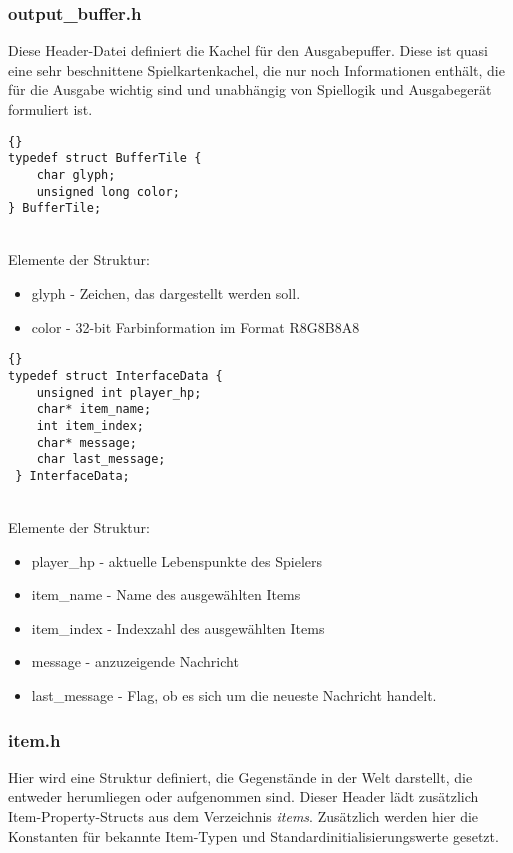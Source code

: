 \documentclass[11pt,a4paper,notitlepage]{report}
\begin{document}
	\newpage
	\subsubsection*{output\_buffer.h}
	Diese Header-Datei definiert die Kachel für den Ausgabepuffer. Diese ist quasi eine sehr beschnittene Spielkartenkachel, die nur noch Informationen enthält, die für die Ausgabe wichtig sind und unabhängig von Spiellogik und Ausgabegerät formuliert ist.
	
		\begin{lstlisting}[caption=BufferTile]{}
typedef struct BufferTile {
	char glyph;
	unsigned long color;
} BufferTile;
		\end{lstlisting} \hspace*{\fill} \\
Elemente der Struktur:
		\begin{itemize}
			\item glyph - Zeichen, das dargestellt werden soll.
			\item color - 32-bit Farbinformation im Format R8G8B8A8
		\end{itemize}
		
		\begin{lstlisting}[caption=InterfaceData]{}
typedef struct InterfaceData {
	unsigned int player_hp;
	char* item_name;
	int item_index;
	char* message;
	char last_message;
 } InterfaceData;
		\end{lstlisting} \hspace*{\fill} \\
Elemente der Struktur:
		\begin{itemize}
			\item player\_hp - aktuelle Lebenspunkte des Spielers
			\item item\_name - Name des ausgewählten Items
			\item item\_index - Indexzahl des ausgewählten Items
			\item message - anzuzeigende Nachricht
			\item last\_message - Flag, ob es sich um die neueste Nachricht handelt.
		\end{itemize}
	
	\newpage
	\subsubsection*{item.h}
	Hier wird eine Struktur definiert, die Gegenstände in der Welt darstellt, die entweder herumliegen oder aufgenommen sind. Dieser Header lädt zusätzlich Item-Property-Structs aus dem Verzeichnis \textit{items}. Zusätzlich werden hier die Konstanten für bekannte Item-Typen und Standardinitialisierungswerte gesetzt.
	
\end{document}
